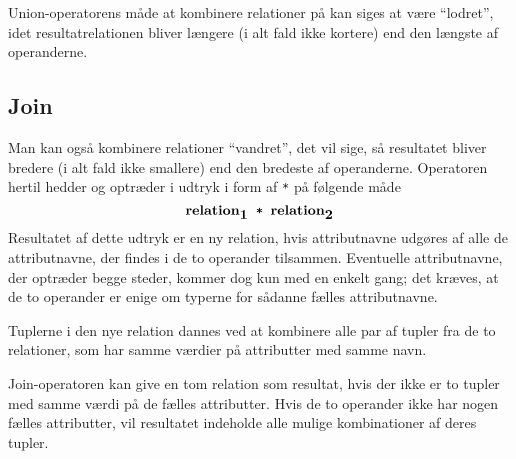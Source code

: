 \documentclass{article}
\begin{document}
\newpage
Union-operatorens m\aa{}de at kombinere relationer
p\aa{} kan siges at v\ae{}re ``lodret'', idet resultatrelationen bliver
l\ae{}ngere (i alt fald ikke kortere) end den l\ae{}ngste af operanderne.

\subsection{Join}
Man kan ogs\aa{} kombinere relationer ``vandret'', det vil sige, s\aa{}
resultatet bliver bredere (i alt fald ikke smallere) end den
bredeste af operanderne. Operatoren hertil hedder {\em {}\/} og
optr\ae{}der i udtryk i form af \verb"*" p\aa{} f\o{}lgende m\aa{}de
$$ \mbox{\bf relation}_{\mbox{\bf 1}}\mbox{\tt ~*~}\mbox{\bf relation}_{\mbox{\bf 2}}$$
Resultatet af dette udtryk er en ny relation, hvis attributnavne udg\o{}res
af alle de attributnavne, der findes i de to operander tilsammen.
Eventuelle attributnavne, der optr\ae{}der begge steder, kommer dog kun med
en enkelt gang; det kr\ae{}ves, at de to operander er enige om
typerne for s\aa{}danne f\ae{}lles attributnavne.

Tuplerne i den nye relation dannes ved at kombinere alle par af tupler fra
de to relationer, som har samme v\ae{}rdier p\aa{} attributter med samme navn.

Join-operatoren kan give en tom relation som resultat, hvis
der ikke er to tupler med samme v\ae{}rdi p\aa{} de f\ae{}lles attributter.
Hvis de to operander ikke har nogen f\ae{}lles
attributter, vil resultatet indeholde alle mulige kombinationer
af deres tupler.
\end{document}
